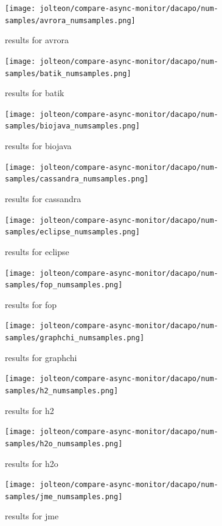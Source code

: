 \documentclass{article}
\begin{document}
    \begin{figure}[H]
    	\centering
    	\texttt{[image: jolteon/compare-async-monitor/dacapo/num-samples/avrora\_numsamples.png]}
    	\caption{results for avrora}
    \end{figure}
    \begin{figure}[H]
    	\centering
    	\texttt{[image: jolteon/compare-async-monitor/dacapo/num-samples/batik\_numsamples.png]}
    	\caption{results for batik}
    \end{figure}
    \begin{figure}[H]
    	\centering
    	\texttt{[image: jolteon/compare-async-monitor/dacapo/num-samples/biojava\_numsamples.png]}
    	\caption{results for biojava}
    \end{figure}
    \begin{figure}[H]
    	\centering
    	\texttt{[image: jolteon/compare-async-monitor/dacapo/num-samples/cassandra\_numsamples.png]}
    	\caption{results for cassandra}
    \end{figure}
    \begin{figure}[H]
    	\centering
    	\texttt{[image: jolteon/compare-async-monitor/dacapo/num-samples/eclipse\_numsamples.png]}
    	\caption{results for eclipse}
    \end{figure}
    \begin{figure}[H]
    	\centering
    	\texttt{[image: jolteon/compare-async-monitor/dacapo/num-samples/fop\_numsamples.png]}
    	\caption{results for fop}
    \end{figure}
    \begin{figure}[H]
    	\centering
    	\texttt{[image: jolteon/compare-async-monitor/dacapo/num-samples/graphchi\_numsamples.png]}
    	\caption{results for graphchi}
    \end{figure}
    \begin{figure}[H]
    	\centering
    	\texttt{[image: jolteon/compare-async-monitor/dacapo/num-samples/h2\_numsamples.png]}
    	\caption{results for h2}
    \end{figure}
    \begin{figure}[H]
    	\centering
    	\texttt{[image: jolteon/compare-async-monitor/dacapo/num-samples/h2o\_numsamples.png]}
    	\caption{results for h2o}
    \end{figure}
    \begin{figure}[H]
    	\centering
    	\texttt{[image: jolteon/compare-async-monitor/dacapo/num-samples/jme\_numsamples.png]}
    	\caption{results for jme}
    \end{figure}
\end{document}
